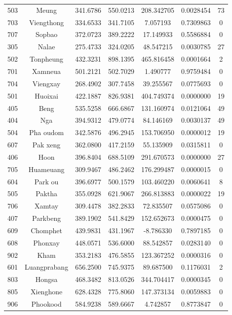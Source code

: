 \documentclass[
  letterpaper,
  DIV=11,
  numbers=noendperiod]{scrartcl}
\begin{document}
\begin{longtable}[]{@{}ccccccc@{}}
503 & Meung & 341.6786 & 550.0213 & 208.342705 & 0.0028454 & 73 \\
703 & Viengthong & 334.6533 & 341.7105 & 7.057193 & 0.7309863 & 0 \\
707 & Sopbao & 372.0723 & 389.2222 & 17.149933 & 0.5586884 & 0 \\
305 & Nalae & 275.4733 & 324.0205 & 48.547215 & 0.0030785 & 27 \\
502 & Tonpheung & 432.3231 & 898.1395 & 465.816458 & 0.0001664 & 2 \\
701 & Xamneua & 501.2121 & 502.7029 & 1.490777 & 0.9759484 & 0 \\
704 & Viengxay & 268.4902 & 307.7458 & 39.255567 & 0.0775693 & 0 \\
501 & Huoixai & 422.1887 & 826.9381 & 404.749374 & 0.0000000 & 19 \\
405 & Beng & 535.5258 & 666.6867 & 131.160974 & 0.0121064 & 49 \\
404 & Nga & 394.9312 & 479.0774 & 84.146169 & 0.0030137 & 49 \\
504 & Pha oudom & 342.5876 & 496.2945 & 153.706950 & 0.0000012 & 19 \\
607 & Pak xeng & 362.0800 & 417.2159 & 55.135909 & 0.0315811 & 0 \\
406 & Hoon & 396.8404 & 688.5109 & 291.670573 & 0.0000000 & 27 \\
705 & Huameuang & 309.9467 & 486.2462 & 176.299487 & 0.0000015 & 0 \\
604 & Park ou & 396.6977 & 500.1579 & 103.460220 & 0.0060641 & 8 \\
505 & Paktha & 355.0928 & 621.9067 & 266.813883 & 0.0000022 & 19 \\
706 & Xamtay & 309.4478 & 382.2833 & 72.835507 & 0.0575086 & 0 \\
407 & Parkbeng & 389.1902 & 541.8429 & 152.652673 & 0.0000475 & 0 \\
609 & Chomphet & 439.9831 & 431.1967 & -8.786330 & 0.7897185 & 0 \\
608 & Phonxay & 448.0571 & 536.6000 & 88.542857 & 0.0283140 & 0 \\
902 & Kham & 353.2183 & 476.5855 & 123.367252 & 0.0000316 & 0 \\
601 & Luangprabang & 656.2500 & 745.9375 & 89.687500 & 0.1176031 & 2 \\
803 & Hongsa & 468.3482 & 813.0526 & 344.704417 & 0.0000345 & 0 \\
805 & Xienghone & 628.4328 & 775.8060 & 147.373134 & 0.0059883 & 0 \\
906 & Phookood & 584.9238 & 589.6667 & 4.742857 & 0.8773847 & 0 \\

\end{longtable}
\end{document}
